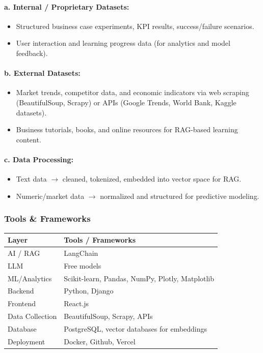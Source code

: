 \documentclass[12pt,letterpaper]{article}
\begin{document}
\paragraph{a. Internal / Proprietary Datasets:}
\begin{itemize}
    \item Structured business case experiments, KPI results, success/failure scenarios.
    \item User interaction and learning progress data (for analytics and model feedback).
\end{itemize}

\paragraph{b. External Datasets:}
\begin{itemize}
    \item Market trends, competitor data, and economic indicators via web scraping (BeautifulSoup, Scrapy) or APIs (Google Trends, World Bank, Kaggle datasets).
    \item Business tutorials, books, and online resources for RAG-based learning content.
\end{itemize}

\paragraph{c. Data Processing:}
\begin{itemize}
    \item Text data $\rightarrow$ cleaned, tokenized, embedded into vector space for RAG.
    \item Numeric/market data $\rightarrow$ normalized and structured for predictive modeling.
\end{itemize}

\subsubsection{ Tools \& Frameworks}

\begin{longtable}{|p{3cm}|p{10cm}|}
\hline
\textbf{Layer} & \textbf{Tools / Frameworks} \\
\hline
AI / RAG & LangChain \\
\hline
LLM & Free models \\
\hline
ML/Analytics & Scikit-learn, Pandas, NumPy, Plotly, Matplotlib \\
\hline
Backend & Python, Django \\
\hline
Frontend & React.js \\
\hline
Data Collection & BeautifulSoup, Scrapy, APIs \\
\hline
Database & PostgreSQL, vector databases for embeddings \\
\hline
Deployment & Docker, Github, Vercel \\
\hline
\end{longtable}
\end{document}
